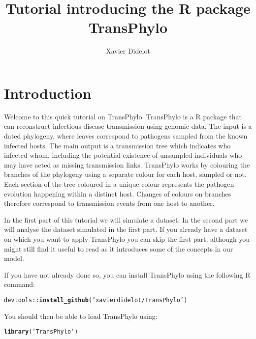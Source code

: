 \documentclass[a4paper]{article}\usepackage[]{graphicx}\usepackage[]{color}
\title{Tutorial introducing the R package TransPhylo}
\author{Xavier Didelot}
\makeatletter
\newcommand{\hlstr}[1]{\textcolor[rgb]{0.192,0.494,0.8}{#1}}%
\newcommand{\hlopt}[1]{\textcolor[rgb]{0,0,0}{#1}}%
\newcommand{\hlstd}[1]{\textcolor[rgb]{0.345,0.345,0.345}{#1}}%
\newcommand{\hlkwd}[1]{\textcolor[rgb]{0.737,0.353,0.396}{\textbf{#1}}}%
\newenvironment{kframe}{%
 \def\at@end@of@kframe{}%
 \ifinner\ifhmode%
  \def\at@end@of@kframe{\end{minipage}}%
  \begin{minipage}{\columnwidth}%
 \fi\fi%
 \def\FrameCommand##1{\hskip\@totalleftmargin \hskip-\fboxsep
 \colorbox{shadecolor}{##1}\hskip-\fboxsep
     \hskip-\linewidth \hskip-\@totalleftmargin \hskip\columnwidth}%
 \MakeFramed {\advance\hsize-\width
   \@totalleftmargin\z@ \linewidth\hsize
   \@setminipage}}%
 {\par\unskip\endMakeFramed%
 \at@end@of@kframe}
\newenvironment{knitrout}{}{} %
\makeatother
\begin{document}
\maketitle

\section*{Introduction}

Welcome to this quick tutorial on TransPhylo. TransPhylo is a R package that can reconstruct infectious disease transmission using genomic data. The input is a dated phylogeny, where leaves correspond to pathogens sampled from the known infected hosts. The main output is a transmission tree which indicates who infected whom, including the potential existence of unsampled individuals who may have acted as missing transmission links. TransPhylo works by colouring the branches of the phylogeny using a separate colour for each host, sampled or not. Each section of the tree  coloured in a unique colour represents the pathogen evolution happening within a distinct host. Changes of colours on branches therefore correspond to transmission events from one host to another.

In the first part of this tutorial we will simulate a dataset. In the second part we will analyse the dataset simulated in the first part. If you already have a dataset on which you want to apply TransPhylo you can skip the first part, although you might still find it useful to read as it introduces some of the concepts in our model.

If you have not already done so, you can install TransPhylo using the following R command:

\begin{knitrout}
\color{fgcolor}\begin{kframe}
\begin{alltt}
\hlstd{devtools}\hlopt{::}\hlkwd{install_github}\hlstd{(}\hlstr{'xavierdidelot/TransPhylo'}\hlstd{)}
\end{alltt}
\end{kframe}
\end{knitrout}

You should then be able to load TransPhylo using:
\begin{knitrout}
\color{fgcolor}\begin{kframe}
\begin{alltt}
\hlkwd{library}\hlstd{(}\hlstr{'TransPhylo'}\hlstd{)}
\end{alltt}
\end{kframe}
\end{knitrout}
\end{document}

